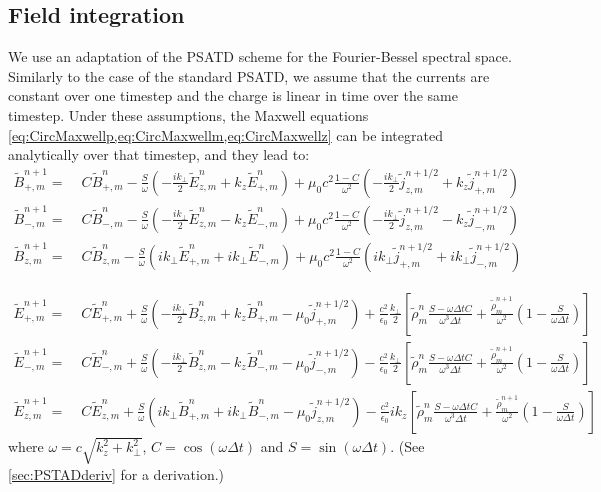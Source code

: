 \documentclass[a4paper]{article}   	%
\newcommand{\tB}[2]{\tilde{B}_{#1,m}^{#2}}
\newcommand{\tE}[2]{\tilde{E}_{#1,m}^{#2}}
\newcommand{\tj}[2]{\tilde{j}_{#1,m}^{#2}}
\newcommand{\trho}[1]{\tilde{\rho}_{m}^{#1}}
\begin{document}
\subsection{Field integration}
\label{sec:FieldIntegration}

We use an adaptation of the PSATD scheme \cite{Haber} for the
Fourier-Bessel spectral space. Similarly to the case of the standard
PSATD, we assume that the currents are constant over one timestep and
the charge is linear in time over the same timestep. Under these
assumptions, the Maxwell equations \cref{eq:CircMaxwellp,eq:CircMaxwellm,eq:CircMaxwellz} can be integrated
analytically over that timestep, and they lead to:
\begin{align*}
\tB{+}{n+1} = \; & C \tB{+}{n} - 
\frac{S}{\omega}\left(-\frac{ik_\perp }{2} \tE{z}{n} + k_z\tE{+}{n}
\right) + \mu_0 c^2\frac{1-C}{\omega^2} \left( -\frac{ik_\perp }{2}
  \tj{z}{n+1/2} + k_z \tj{+}{n+1/2} \right)& \\
\tB{-}{n+1} =\; & C \tB{-}{n} - 
\frac{S}{\omega}\left(- \frac{ik_\perp }{2} \tE{z}{n} - k_z\tE{-}{n}
\right) + \mu_0 c^2\frac{1-C}{\omega^2} \left( - \frac{ik_\perp }{2}
  \tj{z}{n+1/2} - k_z \tj{-}{n+1/2} \right) &\\
\tB{z}{n+1} =\; & C \tB{z}{n} - 
\frac{S}{\omega}\left(ik_\perp \tE{+}{n} + ik_\perp \tE{-}{n}
\right) + \mu_0 c^2\frac{1-C}{\omega^2} \left( ik_\perp
  \tj{+}{n+1/2} + ik_\perp \tj{-}{n+1/2} \right)&
\end{align*}

\begin{align*}
\tE{+}{n+1} = \; & C \tE{+}{n} + 
\frac{S}{\omega}\left(-\frac{ik_\perp }{2} \tB{z}{n} + k_z\tB{+}{n}
- \mu_0 \tj{+}{n+1/2} \right) + \frac{c^2}{\epsilon_0}
\frac{k_\perp}{2}\left[ \trho{n}\frac{S-\omega\Delta t
  C}{\omega^3\Delta t} + \frac{\trho{n+1}}{\omega^2}\left(
  1 - \frac{S}{\omega\Delta t}\right) \right]  & \\
\tE{-}{n+1} =\; & C \tE{-}{n} +
\frac{S}{\omega}\left(- \frac{ik_\perp }{2} \tB{z}{n} - k_z\tB{-}{n}
- \mu_0 \tj{-}{n+1/2} \right) - \frac{c^2}{\epsilon_0}
\frac{k_\perp}{2}\left[ \trho{n}\frac{S-\omega\Delta t
  C}{\omega^3\Delta t} + \frac{\trho{n+1}}{\omega^2}\left(
  1 - \frac{S}{\omega\Delta t}\right) \right]  &\\
\tE{z}{n+1} =\; & C \tE{z}{n} + 
\frac{S}{\omega}\left(ik_\perp \tB{+}{n} + ik_\perp \tB{-}{n}
- \mu_0 \tj{z}{n+1/2} \right) - \frac{c^2}{\epsilon_0}
ik_z\left[ \trho{n}\frac{S-\omega\Delta t
  C}{\omega^3\Delta t} + \frac{\trho{n+1}}{\omega^2}\left(
  1 - \frac{S}{\omega\Delta t}\right) \right]  &
\end{align*}
where $\omega= c\sqrt{k_z^2 + k_\perp^2}$, $C = \cos(\omega \Delta t)$ and $S = \sin(\omega \Delta t) $. (See \cref{sec:PSTADderiv} for a derivation.)

\newpage
\appendix





\end{document}
